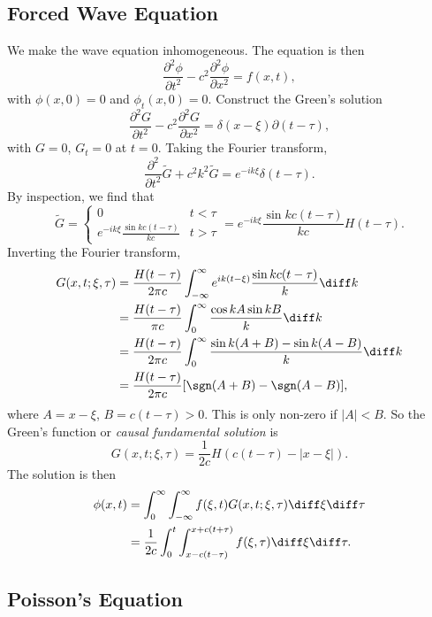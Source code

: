 \documentclass[12pt]{article}
\begin{document}
\subsection{Forced Wave Equation}%
\label{sub:forced_wave_equation}

We make the wave equation inhomogeneous. The equation is then
\[
	\frac{\partial^2 \phi}{\partial t^2} - c^2 \frac{\partial^2 \phi}{\partial x^2} = f(x, t)
,\]
with $\phi(x, 0) = 0$ and $\phi_t(x, 0) = 0$. Construct the Green's solution
\[
	\frac{\partial^2 G}{\partial t^2} - c^2 \frac{\partial^2 G}{\partial x^2} = \delta(x - \xi)\partial(t - \tau)
,\]
with $G = 0$, $G_t = 0$ at $t = 0$. Taking the Fourier transform,
\[
	\frac{\partial^2}{\partial t^2} \tilde G + c^2 k^2 \tilde G = e^{-ik\xi}\delta(t - \tau)
.\]
By inspection, we find that
\[
\tilde G =
\begin{cases}
	0 & t < \tau \\
	e^{-ik\xi} \frac{\sin kc(t - \tau)}{kc} & t > \tau
\end{cases} = e^{-ik\xi} \frac{\sin kc(t - \tau)}{kc} H(t - \tau).
\]
Inverting the Fourier transform,
\begin{align*}
	G(x, t;\xi, \tau) &= \frac{H(t - \tau)}{2\pi c} \int_{-\infty}^{\infty} e^{ik(t - \xi)} \frac{\sin kc(t - \tau)}{k} \diff k \\
			  &= \frac{H(t - \tau)}{\pi c} \int_{0}^{\infty} \frac{\cos k A \sin k B}{k} \diff k \\
			  &= \frac{H(t - \tau)}{2 \pi c}\int_{0}^{\infty} \frac{\sin k(A + B) - \sin k(A - B)}{k} \diff k \\
			  &= \frac{H(t - \tau)}{2 \pi c}[\sgn(A + B) - \sgn(A - B)],
\end{align*}
where $A = x - \xi$, $B = c(t - \tau) > 0$. This is only non-zero if $|A| < B$. So the Green's function or \textit{causal fundamental solution} is
\[
	G(x, t; \xi, \tau) = \frac{1}{2c}H(c(t - \tau) - |x - \xi|)
.\]
The solution is then
\begin{align*}
	\phi(x, t) &= \int_{0}^{\infty}\int_{-\infty}^{\infty}f(\xi, t) G(x, t; \xi, \tau) \diff \xi \diff \tau \\
		   &= \frac{1}{2c} \int_{0}^{t} \int_{x-c(t - \tau)}^{x+c(t + \tau)}f(\xi, \tau) \diff \xi \diff \tau.
\end{align*}

\subsection{Poisson's Equation}%
\label{sub:poisson_s_equation}
\end{document}
